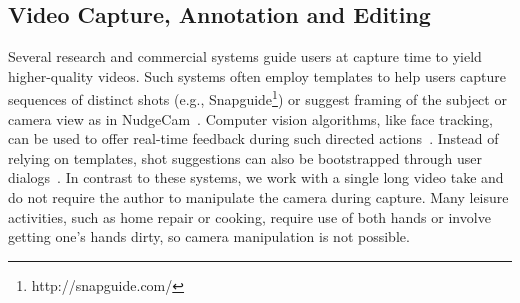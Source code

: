 %

\subsection{Video Capture, Annotation and Editing}
 Several research and commercial systems guide users at capture time to yield higher-quality videos. Such systems often employ templates to help users capture sequences of distinct shots (e.g., Snapguide\footnote{http://snapguide.com/}) or suggest framing of the subject or camera view as in NudgeCam~\cite{Carter:2010}. Computer vision algorithms, like face tracking, can be used to offer real-time feedback during such directed actions~\cite{Davis:2003cu,Heer:2004ba,Carter:2010}. Instead of relying on templates, shot suggestions can also be bootstrapped through user dialogs~\cite{Adams:2005}. In contrast to these systems, we work with a single long video take and do not require the author to manipulate the camera during capture. Many leisure activities, such as home repair or cooking, require use of both hands or involve getting one's hands dirty, so camera manipulation is not possible.


